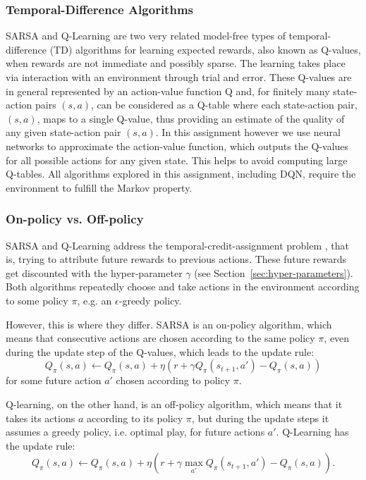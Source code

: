 \documentclass[conference]{IEEEtran}
\begin{document}
\subsubsection{Temporal-Difference Algorithms}
SARSA and Q-Learning are two very related model-free types of temporal-difference (TD) algorithms for learning expected rewards, also known as Q-values, when rewards are not immediate and possibly sparse. The learning takes place via interaction with an environment through trial and error. These Q-values are in general represented by an action-value function Q and, for finitely many state-action pairs $(s,a)$, can be considered as a Q-table where each state-action pair, $(s,a)$, maps to a single Q-value, thus providing an estimate of the quality of any given state-action pair $(s,a)$. In this assignment however we use neural networks to approximate the action-value function, which outputs the Q-values for all possible actions for any given state. This helps to avoid computing large Q-tables. All algorithms explored in this assignment, including DQN, require the environment to fulfill the Markov property.

\subsubsection{On-policy vs. Off-policy}
SARSA and Q-Learning address the temporal-credit-assignment problem \cite{sutton1984}, that is, trying to attribute future rewards to previous actions. These future rewards get discounted with the hyper-parameter $\gamma$ (see Section~\ref{sec:hyper-parameters}). Both algorithms repeatedly choose and take actions in the environment according to some policy $\pi$, e.g. an $\epsilon$-greedy policy.

However, this is where they differ.
SARSA is an on-policy algorithm, which means that consecutive actions are chosen according to the same policy $\pi$, even during the update step of the Q-values, which leads to the update rule: $$Q_\pi(s,a) \leftarrow Q_\pi(s,a) + \eta(r + \gamma Q_\pi(s_{t+1},a') - Q_\pi(s,a))$$ for some future action $a'$ chosen according to policy $\pi$.

Q-learning, on the other hand, is an off-policy algorithm, which means that it takes its actions $a$ according to its policy $\pi$, but during the update steps it assumes a greedy policy, i.e. optimal play, for future actions $a'$. 
Q-Learning has the update rule: $$Q_\pi(s,a) \leftarrow Q_\pi(s,a) + \eta(r + \gamma \max_{a'} Q_\pi(s_{t+1},a') - Q_\pi(s,a)).$$ 
\end{document}
